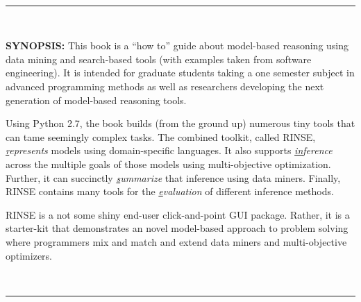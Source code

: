 \documentclass[9pt,twocolumn]{article}
\begin{document}
\begin{center}

 \begin{minipage}{.7\linewidth}
   ~\hrule~

   {\bf SYNOPSIS:} This book is a  ``how to'' guide about model-based reasoning using
   data mining and search-based tools (with examples taken from software engineering).
   It is intended for graduate  students taking
  a one semester subject in advanced programming methods as
  well as researchers developing the next generation
  of model-based reasoning tools.  

  \vspace{2mm}Using Python 2.7, the book builds (from the ground up) numerous
  tiny tools that can tame seemingly complex
  tasks. The combined toolkit, called RINSE, 
  {\em \underline{r}epresents}  models using domain-specific languages.  It also supports
    {\em \underline{in}ference} across the multiple goals of those models using multi-objective optimization.
    Further, it can 
    succinctly {\em \underline{s}ummarize} that inference  using data miners.
    Finally, RINSE contains many tools for the
   {\em \underline{e}valuation} of different inference methods. 

   \vspace{2mm}RINSE is a not some shiny  end-user click-and-point GUI package.
   Rather, it is a starter-kit that demonstrates an novel  model-based approach to problem solving where programmers
   mix and match and extend data miners and multi-objective optimizers.

  
  ~\hrule~
  
  \end{minipage}

  \end{center}
\thispagestyle{empty}
\clearpage
\small
\twocolumn



\fancyhead[LE,RO]{\slshape \rightmark}
\fancyhead[LO,RE]{\slshape \leftmark}

\tableofcontents

\vfill
\end{document}
